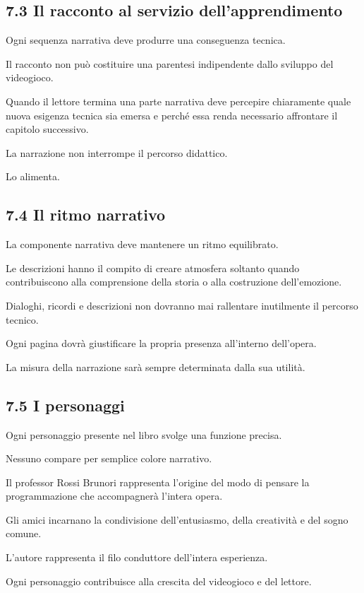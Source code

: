 \documentclass{article}
\begin{document}
\subsection[7.3 Il racconto al servizio dell{}'apprendimento]{7.3 Il racconto al servizio dell'apprendimento}
Ogni sequenza narrativa deve produrre una conseguenza tecnica.

Il racconto non può costituire una parentesi indipendente dallo sviluppo del videogioco.

Quando il lettore termina una parte narrativa deve percepire chiaramente quale nuova esigenza tecnica sia emersa e
perché essa renda necessario affrontare il capitolo successivo.

La narrazione non interrompe il percorso didattico.

Lo alimenta.

\subsection{7.4 Il ritmo narrativo}
La componente narrativa deve mantenere un ritmo equilibrato.

Le descrizioni hanno il compito di creare atmosfera soltanto quando contribuiscono alla comprensione della storia o alla
costruzione dell'emozione.

Dialoghi, ricordi e descrizioni non dovranno mai rallentare inutilmente il percorso tecnico.

Ogni pagina dovrà giustificare la propria presenza all'interno dell'opera.

La misura della narrazione sarà sempre determinata dalla sua utilità.

\subsection{7.5 I personaggi}
Ogni personaggio presente nel libro svolge una funzione precisa.

Nessuno compare per semplice colore narrativo.

Il professor Rossi Brunori rappresenta l'origine del modo di pensare la programmazione che accompagnerà l'intera opera.

Gli amici incarnano la condivisione dell'entusiasmo, della creatività e del sogno comune.

L'autore rappresenta il filo conduttore dell'intera esperienza.

Ogni personaggio contribuisce alla crescita del videogioco e del lettore.
\end{document}
